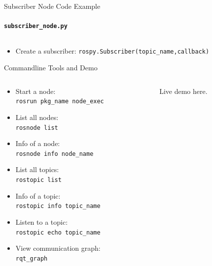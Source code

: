 \documentclass{beamer}
\newcommand{\pyinline}[1]{\texttt{#1}}
\newcommand{\inline}[1]{\texttt{#1}}
\begin{document}
\begin{frame}{Subscriber Node Code Example}
	\framesubtitle{\texttt{subscriber\_node.py}}
	\inputminted{python}{snippet/subscriber_node.py}
	\begin{itemize}
		\item Create a subscriber: \pyinline{rospy.Subscriber(topic_name,callback)}
	\end{itemize}
\end{frame}

\begin{frame}{Commandline Tools and Demo}
	\begin{columns}
		\begin{column}{0.5\textwidth}
			\begin{itemize}
				\item Start a node:\\\inline{rosrun pkg_name node_exec}
				\item List all nodes:\\\inline{rosnode list}
				\item Info of a node:\\\inline{rosnode info node_name}
				\item List all topics:\\\inline{rostopic list}
				\item Info of a topic:\\\inline{rostopic info topic_name}
				\item Listen to a topic:\\\inline{rostopic echo topic_name}
				\item View communication graph:\\\inline{rqt_graph}
			\end{itemize}
		\end{column}
		\begin{column}{0.5\textwidth}
			\centering
			Live demo here.
		\end{column}
	\end{columns}
\end{frame}
\end{document}
